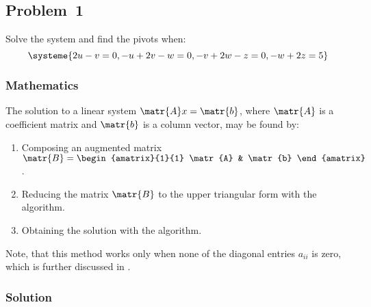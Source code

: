 \subsection{Problem~1}%
\label{problem:1}

Solve the system and find the pivots when:
\begin{equation*}
    \systeme{2u-v=0,-u+2v-w=0,-v+2w-z=0,-w+2z=5}
\end{equation*}

\subsubsection*{Mathematics}

The solution to a linear system $\matr{A}x = \matr{b}$, where $\matr{A}$ is a
coefficient matrix and $\matr{b}$ is a column vector, may be found by:
\begin{enumerate}
  \item Composing an augmented matrix
    $\matr{B} = \begin{amatrix}{1}{1}
      \matr{A} & \matr{b}
    \end{amatrix}$.
  \item Reducing the matrix $\matr{B}$ to the upper triangular form
    with the \textit{} algorithm.
  \item Obtaining the solution with the \textit{} algorithm.
\end{enumerate}

Note, that this method works only when none of the diagonal entries $a_{ii}$ is zero,
which is further discussed in .

\subsubsection*{Solution}

